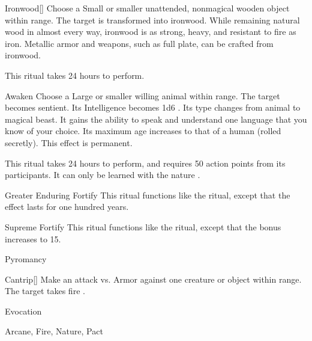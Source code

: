 \begin{ability}[\nth{3}]{Ironwood}[]
Choose a Small or smaller unattended, nonmagical wooden object within \rngclose range.
The target is transformed into ironwood.
While remaining natural wood in almost every way, ironwood is as strong, heavy, and resistant to fire as iron.
Metallic armor and weapons, such as full plate, can be crafted from ironwood.

This ritual takes 24 hours to perform.
\end{ability}
\vspace{0.25em}



\begin{ability}[\nth{5}]{Awaken}
Choose a Large or smaller willing animal within \rngclose range.
The target becomes sentient.
Its Intelligence becomes 1d6 .
Its type changes from animal to magical beast.
It gains the ability to speak and understand one language that you know of your choice.
Its maximum age increases to that of a human (rolled secretly).
This effect is permanent.

This ritual takes 24 hours to perform, and requires 50 action points from its participants.
It can only be learned with the nature .
\end{ability}
\vspace{0.25em}



\begin{ability}[\nth{5}]{Greater Enduring Fortify}
This ritual functions like the  ritual, except that the effect lasts for one hundred years.
\end{ability}
\vspace{0.25em}



\begin{ability}[\nth{6}]{Supreme Fortify}
This ritual functions like the  ritual, except that the  bonus increases to 15.
\end{ability}
\vspace{0.25em}


\newpage
\begin{spellsection}{Pyromancy}

\begin{spellheader}
\end{spellheader}


\begin{ability}{Cantrip}[]
Make an attack vs. Armor against one creature or object within \rngmed range.
\hit The target takes fire .
\end{ability}




 Evocation

 Arcane, Fire, Nature, Pact
\end{spellsection}


